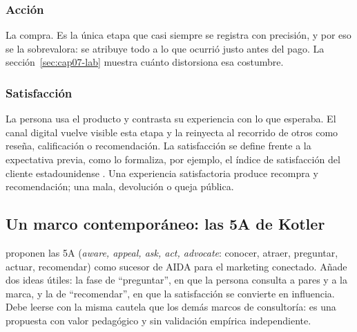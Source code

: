 \subsubsection{Acción}
La compra. Es la única etapa que casi siempre se registra con precisión, y
por eso se la sobrevalora: se atribuye todo a lo que ocurrió justo antes del
pago. La sección~\ref{sec:cap07-lab} muestra cuánto distorsiona esa
costumbre.

\subsubsection{Satisfacción}
La persona usa el producto y contrasta su experiencia con lo que esperaba. El
canal digital vuelve visible esta etapa y la reinyecta al recorrido de otros
como reseña, calificación o recomendación. La satisfacción se define frente a la expectativa previa, como lo formaliza,
por ejemplo, el índice de satisfacción del cliente estadounidense
\parencite{fornell1996}. Una experiencia satisfactoria
produce recompra y recomendación; una mala, devolución o queja pública.

\subsection{Un marco contemporáneo: las 5A de Kotler}

\textcite{kotler2021marketing50} proponen las 5A (\textit{aware, appeal, ask,
act, advocate}: conocer, atraer, preguntar, actuar, recomendar) como sucesor
de AIDA para el marketing conectado. Añade dos ideas útiles: la fase de
\enquote{preguntar}, en que la persona consulta a pares y a la marca, y la de
\enquote{recomendar}, en que la satisfacción se convierte en influencia. Debe
leerse con la misma cautela que los demás marcos de consultoría: es una
propuesta con valor pedagógico y sin validación empírica independiente.

